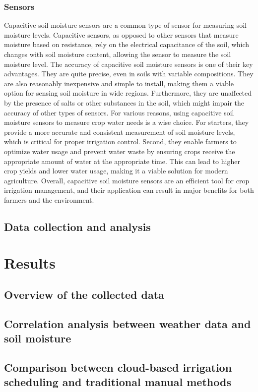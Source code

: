 \documentclass[11pt]{scrartcl} %
\begin{document}
\subsubsection{Sensors}
Capacitive soil moisture sensors are a common type of sensor for measuring soil moisture levels. Capacitive sensors, as opposed to other sensors that measure moisture based on resistance, rely on the electrical capacitance of the soil, which changes with soil moisture content, allowing the sensor to measure the soil moisture level.
\newline The accuracy of capacitive soil moisture sensors is one of their key advantages. They are quite precise, even in soils with variable compositions. They are also reasonably inexpensive and simple to install, making them a viable option for sensing soil moisture in wide regions. Furthermore, they are unaffected by the presence of salts or other substances in the soil, which might impair the accuracy of other types of sensors.
\newline For various reasons, using capacitive soil moisture sensors to measure crop water needs is a wise choice. For starters, they provide a more accurate and consistent measurement of soil moisture levels, which is critical for proper irrigation control. Second, they enable farmers to optimize water usage and prevent water waste by ensuring crops receive the appropriate amount of water at the appropriate time. This can lead to higher crop yields and lower water usage, making it a viable solution for modern agriculture. Overall, capacitive soil moisture sensors are an efficient tool for crop irrigation management, and their application can result in major benefits for both farmers and the environment.
\subsection{Data collection and analysis}
\section{Results}
\subsection{Overview of the collected data}
\subsection{Correlation analysis between weather data and soil moisture}
\subsection{Comparison between cloud-based irrigation scheduling and traditional manual methods}
\end{document}
